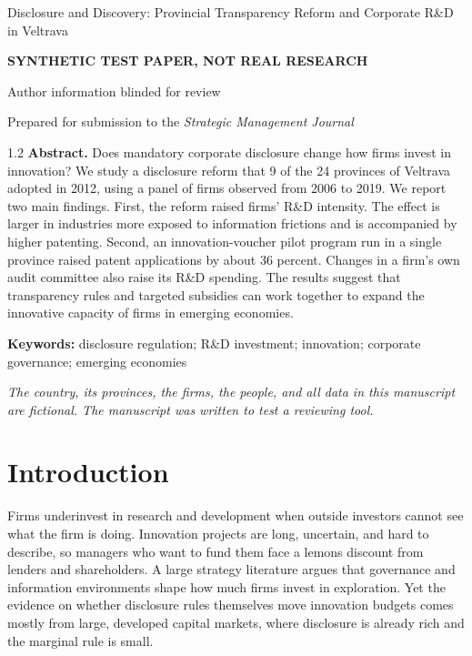 \documentclass[12pt]{article}
\begin{document}
\begin{titlepage}
\begin{center}
\vspace*{1.2in}
{\LARGE Disclosure and Discovery: Provincial Transparency Reform and Corporate R\&D in Veltrava\par}
\vspace{0.3in}
{\large \textbf{SYNTHETIC TEST PAPER, NOT REAL RESEARCH}\par}
\vspace{0.3in}
{\large Author information blinded for review\par}
\vspace{0.2in}
Prepared for submission to the \textit{Strategic Management Journal}\par
\vspace{0.4in}
\end{center}
\begin{spacing}{1.2}
\noindent\textbf{Abstract.} Does mandatory corporate disclosure change how firms invest in innovation? We study a disclosure reform that 9 of the 24 provinces of Veltrava adopted in 2012, using a panel of firms observed from 2006 to 2019. We report two main findings. First, the reform raised firms' R\&D intensity. The effect is larger in industries more exposed to information frictions and is accompanied by higher patenting. Second, an innovation-voucher pilot program run in a single province raised patent applications by about 36 percent. Changes in a firm's own audit committee also raise its R\&D spending. The results suggest that transparency rules and targeted subsidies can work together to expand the innovative capacity of firms in emerging economies.

\vspace{0.15in}
\noindent\textbf{Keywords:} disclosure regulation; R\&D investment; innovation; corporate governance; emerging economies

\vspace{0.15in}
\noindent\textit{The country, its provinces, the firms, the people, and all data in this manuscript are fictional. The manuscript was written to test a reviewing tool.}
\end{spacing}
\end{titlepage}
\setcounter{page}{2}

\section{Introduction}

Firms underinvest in research and development when outside investors cannot see what the firm is doing. Innovation projects are long, uncertain, and hard to describe, so managers who want to fund them face a lemons discount from lenders and shareholders. A large strategy literature argues that governance and information environments shape how much firms invest in exploration. Yet the evidence on whether disclosure rules themselves move innovation budgets comes mostly from large, developed capital markets, where disclosure is already rich and the marginal rule is small.
\end{document}
